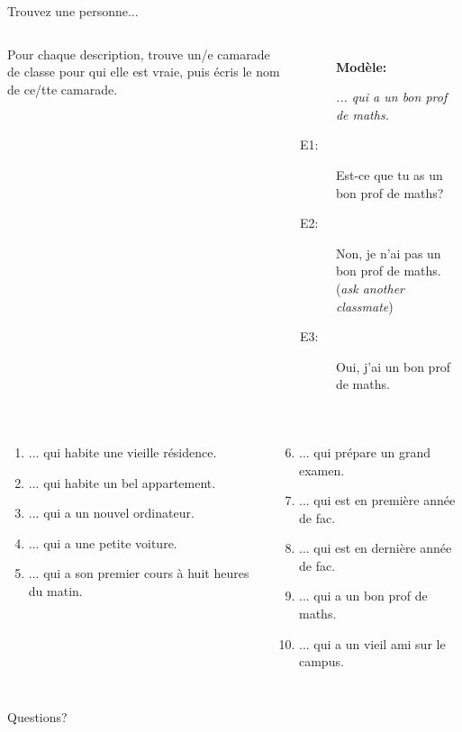 \documentclass{beamer}
\begin{document}
  \begin{frame}{Trouvez une personne...}
    \begin{columns}
        Pour chaque description, trouve un/e camarade de classe pour qui elle est vraie, puis écris le nom de ce/tte camarade. \\
        {\scriptsize
        \begin{description}
          \item[] \textbf{Modèle:}
          \item[] \emph{... qui a un bon prof de maths.}
          \item[E1:] Est-ce que tu as un bon prof de maths?
          \item[] 
          \item[E2:] Non, je n'ai pas un bon prof de maths. (\emph{ask another classmate})
          \item[] 
          \item[E3:] Oui, j'ai un bon prof de maths.
          \item[] 
        \end{description}
        }
    \end{columns}
    \vspace{0.5cm}
    {\scriptsize
    \begin{columns}[t]
        \begin{enumerate}
          \item ... qui habite une vieille résidence.
          \item ... qui habite un bel appartement.
          \item ... qui a un nouvel ordinateur.
          \item ... qui a une petite voiture.
          \item ... qui a son premier cours à huit heures du matin.
        \end{enumerate}
        \begin{enumerate}
          \setcounter{enumi}{5}
          \item ... qui prépare un grand examen.
          \item ... qui est en première année de fac.
          \item ... qui est en dernière année de fac.
          \item ... qui a un bon prof de maths.
          \item ... qui a un vieil ami sur le campus.
        \end{enumerate}
    \end{columns}
    }
  \end{frame}

  \begin{frame}{}
    \begin{center}
      \Large Questions?
    \end{center}
  \end{frame}
\end{document}
